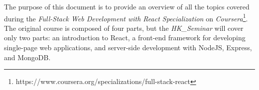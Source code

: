 \documentclass[twoside]{supsistudent}
\begin{document}
\maketitle
\onehalfspacing
\frontmatter



\newpage
\mainmatter
{}
\setcounter{page}{1}



The purpose of this document is to provide an overview of all the topics covered during the \textit{Full-Stack Web Development with React Specialization} on \textit{Coursera}\footnote{https://www.coursera.org/specializations/full-stack-react}. The original course is composed of four parts, but the \textit{HK\_Seminar} will cover only two parts: an introduction to React, a front-end framework for developing single-page web applications, and server-side development with NodeJS, Express, and MongoDB.







% 
% 
\end{document}
